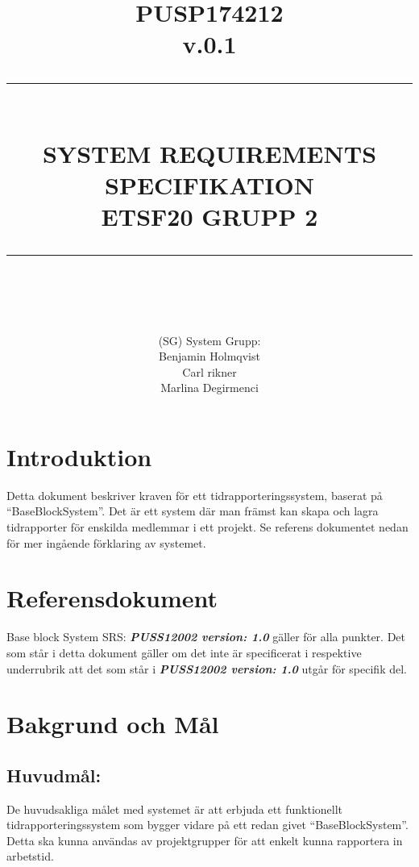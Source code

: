 \documentclass[paper=a4, fontsize=11pt,twoside]{article}
\title{ 														%
	\documentNumber{#1}											%
	\documentVersion{#2}											%
	\HRule{0.5pt} \\ %
	\LARGE \textbf{\uppercase{#3}} \\  									%
	\large \textbf{\uppercase{ETSF20 Grupp 2}}							%
	\HRule{2pt} \\ [0.5cm]      	%
	\normalsize          		%
	}															%
\author{#4}													%
\date{}                                           	%
\newcommand{\HRule}[1]{\rule{\linewidth}{#1}}   							%
\newcommand{\documentNumber}[1]{\centering PUSP1742#1 \\[1.0cm]}	 		%
\newcommand{\documentVersion}[1]{\centering \small{v.#1} \\[1.0cm]}	 		%
\newcommand{\grouptitlepage}[4]{										%
	\title{ 														%
	\documentNumber{#1}											%
	\documentVersion{#2}											%
	\HRule{0.5pt} \\ %
	\LARGE \textbf{\uppercase{#3}} \\  									%
	\large \textbf{\uppercase{ETSF20 Grupp 2}}							%
	\HRule{2pt} \\ [0.5cm]      	%
	\normalsize          		%
	}															%
	\author{#4}													%
	\maketitle														%
	\tableofcontents												%
	\thispagestyle{empty} 											%
	\newpage														%
}																%
\begin{document}
\grouptitlepage
{12	}
{0.1}
{System Requirements Specifikation}
{(SG) System Grupp: \\ Benjamin Holmqvist \\ Carl rikner \\Marlina Degirmenci}	
\section{Introduktion}
Detta dokument beskriver kraven för ett tidrapporteringssystem, baserat på “BaseBlockSystem”. Det är ett system där man främst kan skapa och lagra tidrapporter för enskilda medlemmar i ett projekt. Se referens dokumentet nedan för mer ingående förklaring av systemet.
\section{Referensdokument}
Base block System SRS: \textbf{\textit{PUSS12002 version: 1.0}}  gäller för alla punkter. Det som står i detta dokument gäller om det inte är specificerat i respektive underrubrik att det som står i \textbf{\textit{PUSS12002 version: 1.0}}  utgår för specifik del.

\section{Bakgrund och Mål}

\subsection{Huvudmål:}
De huvudsakliga målet med systemet är att erbjuda ett funktionellt tidrapporteringssystem som bygger vidare på ett redan givet “BaseBlockSystem”. Detta ska kunna användas av projektgrupper för att enkelt kunna rapportera in arbetstid.
\end{document}
